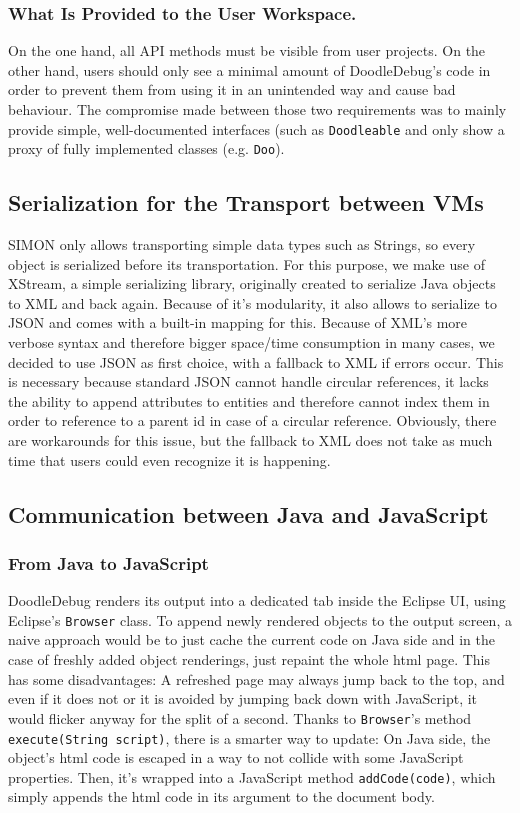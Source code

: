 \documentclass{acm_proc_article-sp}
\newcommand{\nb}[2]{\nbc{#1}{#2}{orange}}
\newcommand\todo[1]{\nb{TO DO}{#1}}
\begin{document}
\subsubsection{What Is Provided to the User Workspace.}
On the one hand, all API methods must be visible from user projects. On the other hand, users should only see a minimal amount of DoodleDebug's code in order to prevent them from using it in an unintended way and cause bad behaviour. The compromise made between those two requirements was to mainly provide simple, well-documented interfaces (such as \verb-Doodleable- and only show a proxy of fully implemented classes (e.g. \verb-Doo-).

\subsection{Serialization for the Transport between VMs}
SIMON only allows transporting simple data types such as Strings, so every object is serialized before its transportation. For this purpose, we make use of XStream\cite{xstream}, a simple serializing library, originally created to serialize Java objects to XML and back again. Because of it's modularity, it also allows to serialize to JSON and comes with a built-in mapping for this. Because of XML's more verbose syntax and therefore bigger space/time consumption in many cases, we decided to use JSON as first choice, with a fallback to XML if errors occur. This is necessary because standard JSON cannot handle circular references, it lacks the ability to append attributes to entities and therefore cannot index them in order to reference to a parent id in case of a circular reference. Obviously, there are workarounds for this issue, but the fallback to XML does not take as much time that users could even recognize it is happening.

\todo{Maybe simple benchmark of XML vs. JSON here}

\subsection{Communication between Java and JavaScript}
\subsubsection{From Java to JavaScript}
DoodleDebug renders its output into a dedicated tab inside the Eclipse UI, using Eclipse's \verb.Browser. class. To append newly rendered objects to the output screen, a naive approach would be to just cache the current code on Java side and in the case of freshly added object renderings, just repaint the whole html page. This has some disadvantages: A refreshed page may always jump back to the top, and even if it does not or it is avoided by jumping back down with JavaScript, it would flicker anyway for the split of a second. Thanks to \verb.Browser.'s method \verb.execute(String script)., there is a smarter way to update: On Java side, the object's html code is escaped in a way to not collide with some JavaScript properties. Then, it's wrapped into a JavaScript method \verb.addCode(code)., which simply appends the html code in its argument to the document body.
\end{document}
